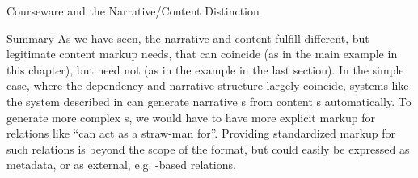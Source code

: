 \begin{tchapter}[id=courseware]{Courseware and the Narrative/Content Distinction}
\begin{tsection}[id=courseware-summary]{Summary}
As we have seen, the narrative and content fulfill different, but legitimate
content markup needs, that can coincide (as in the main example in this chapter),
but need not (as in the example in the last section). In the simple case, where
the dependency and narrative structure largely coincide, systems like the
{\activemath} system described in {} can generate narrative
{\omdoc}s from content {\omdoc}s automatically. To generate more complex
{s}, we would have to
have more explicit markup for relations like ``can act as a straw-man for''.
Providing standardized markup for such relations is beyond the scope of the
{\omdoc} format, but could easily be expressed as metadata, or as external, e.g.
{\rdf}-based relations.
\end{tsection}
\end{tchapter}



